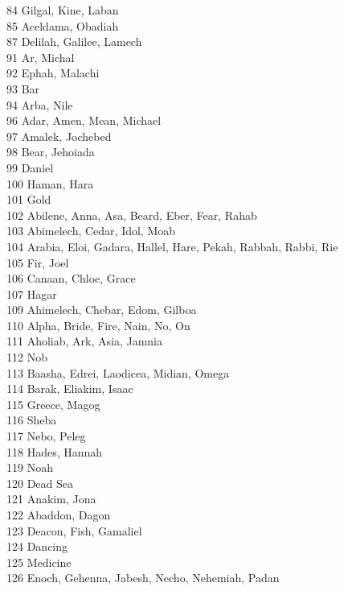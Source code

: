 84 \quad Gilgal, Kine, Laban\\
85 \quad Aceldama, Obadiah\\
87 \quad Delilah, Galilee, Lamech\\
91 \quad Ar, Michal\\
92 \quad Ephah, Malachi\\
93 \quad Bar\\
94 \quad Arba, Nile\\
96 \quad Adar, Amen, Mean, Michael\\
97 \quad Amalek, Jochebed\\
98 \quad Bear, Jehoiada\\
99 \quad Daniel\\
100 \quad Haman, Hara\\
101 \quad Gold\\
102 \quad Abilene, Anna, Asa, Beard, Eber, Fear, Rahab\\
103 \quad Abimelech, Cedar, Idol, Moab\\
104 \quad Arabia, Eloi, Gadara, Hallel, Hare, Pekah, Rabbah, Rabbi, Rie\\
105 \quad Fir, Joel\\
106 \quad Canaan, Chloe, Grace\\
107 \quad Hagar\\
109 \quad Ahimelech, Chebar, Edom, Gilboa\\
110 \quad Alpha, Bride, Fire, Nain, No, On\\
111 \quad Aholiab, Ark, Asia, Jamnia\\
112 \quad Nob\\
113 \quad Baasha, Edrei, Laodicea, Midian, Omega\\
114 \quad Barak, Eliakim, Isaac\\
115 \quad Greece, Magog\\
116 \quad Sheba\\
117 \quad Nebo, Peleg\\
118 \quad Hades, Hannah\\
119 \quad Noah\\
120 \quad Dead Sea\\
121 \quad Anakim, Jona\\
122 \quad Abaddon, Dagon\\
123 \quad Deacon, Fish, Gamaliel\\
124 \quad Dancing\\
125 \quad Medicine\\
126 \quad Enoch, Gehenna, Jabesh, Necho, Nehemiah, Padan\\
